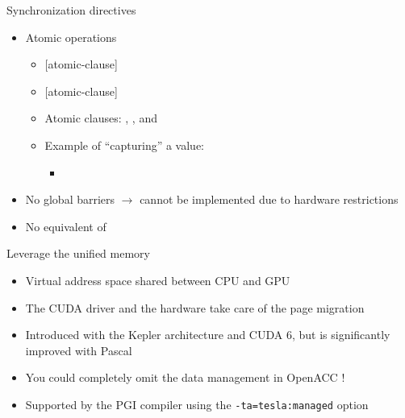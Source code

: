 \documentclass[12pt,aspectratio=169]{beamer}
\newcommand\shinline[2][]{\lstinline[style=shstyle,basicstyle=\ttfamily,#1]!#2!}
\begin{document}
\begin{frame}[fragile]{Synchronization directives}
  \begin{itemize}
  \item Atomic operations
    \begin{itemize}
    \item {} [atomic-clause]
    \item {} [atomic-clause]
    \item Atomic clauses: , ,
       and 
    \item Example of ``capturing'' a value:
      \begin{itemize}
      \item {}
      \end{itemize}
    \end{itemize}
  \item No global barriers $\rightarrow$ cannot be implemented due to hardware restrictions
  \item No equivalent of 
  \end{itemize}
\end{frame}

\begin{frame}[fragile]{Leverage the unified memory}
  \begin{itemize}
  \item Virtual address space shared between CPU and GPU
  \item The CUDA driver and the hardware take care of the page migration
  \item Introduced with the Kepler architecture and CUDA 6, but is significantly improved with Pascal
    \pause\vfill
  \item You could completely omit the data management in OpenACC !
  \item Supported by the PGI compiler using the \shinline{-ta=tesla:managed} option
  \end{itemize}
\end{frame}
\end{document}
